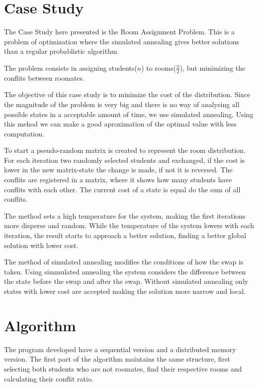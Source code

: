 \documentclass[a4paper,10pt,openright,openbib,twocolumn]{article}
\begin{document}
\section{Case Study}

The Case Study here presented is the Room Assignment Problem. This is a problem of optimization where the simulated annealing gives better solutions than a regular probablistic algorithm.

The problem consists in assigning students($n$) to rooms($\frac{n}{2}$), but minimizing the conflits between roomates.

The objective of this case study is to minimize the cost of the distribution. Since the magnitude of the problem is very big and there is no way of analysing all possible states in a acceptable amount of time, we use simulated annealing. Using this mehod we can make a good aproximation of the optimal value with less computation.

To start a pseudo-random matrix is created to represent the room distribution. For each iteration two randomly selected students and exchanged, if the cost is lower in the new matrix-state the change is made, if not it is reversed.
The conflits are registered in a matrix, where it shows how many students have conflits with each other.
The current cost of a state is equal do the sum of all conflits.

The method sets a high temperature for the system, making the first iterations more disperse and random. While the temperature of the system lowers with each iteration, the result starts to approach a better solution, finding a better global solution with lower cost.

The method of simulated annealing modifies the conditions of how the swap is taken. Using simmulated annealing the system considers the difference between the state before the swap and after the swap. Without simulated annealing only states with lower cost are accepted making the solution more narrow and local.

\section{Algorithm}
The program developed have a sequential version and a distributed memory version. 
The first part of the algorithm maintains the same structure, first selecting both students who are not roomates, find their respective rooms and calculating their conflit ratio.
\end{document}
